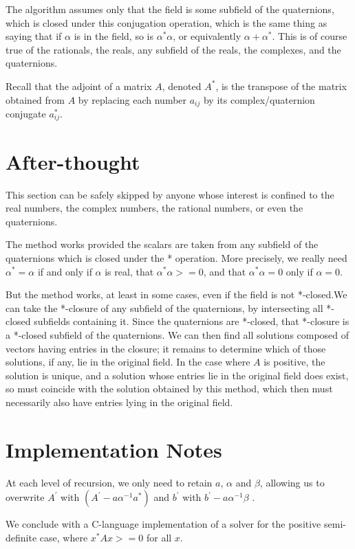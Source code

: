 \documentclass{article}
\begin{document}
The algorithm assumes only that the field is some subfield of the quaternions, which is closed under this conjugation operation, which is the same thing as saying that if $\alpha$ is in the field, so is $\alpha^*\alpha$, or equivalently $\alpha + \alpha^*$. This is of course true of the rationals, the reals, any subfield of the reals, the complexes, and the quaternions.

Recall that the adjoint of a matrix $A$, denoted $A^*$, is the transpose of the matrix obtained from $A$ by replacing each number $a_{ij}$ by its complex/quaternion conjugate $a_{ij}^*$.


\section{After-thought}
This section can be safely skipped by anyone whose interest is confined to
the real numbers, the complex numbers, the rational numbers, or even the quaternions.

The method works provided the scalars are taken from any subfield of the
quaternions which is closed under the * operation. More precisely, we really
need $\alpha^* = \alpha$ if and only if $\alpha$ is real, that $\alpha^*\alpha >= 0$, and that 
$\alpha^*\alpha = 0$ only if $\alpha=0$.

But the method works, at least in some cases, even if the field is not *-closed.We can take the *-closure of any subfield of the quaternions, by intersecting all *-closed subfields containing it. Since the quaternions are *-closed, that *-closure is a *-closed subfield of the quaternions. We can then find all solutions composed of vectors having entries in the closure; it remains to determine
which of those solutions, if any, lie in the original field. In the case where
$A$ is positive, the solution is unique, and a solution whose entries lie in the original field does exist, so must coincide with the solution obtained by this method, which then must necessarily also have entries lying in the original field.

\section{Implementation Notes}
At each level of recursion, we only need to retain
$a$,
$\alpha$
and
$\beta$, allowing us to overwrite
$A^{'}$
with $(A^{'} - a\alpha^{-1}a^*)$
and
$b^{'}$ with
$b^{'}-a\alpha^{-1}\beta$
.

We conclude with a C-language implementation of a solver for the positive semi-definite case, where
$x^*Ax >=0 $ for all $x$.
\end{document}
